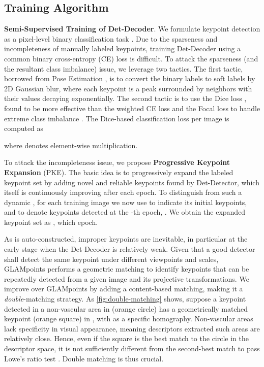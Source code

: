 \subsection{Training Algorithm}  \label{ssec:training}

\textbf{Semi-Supervised Training of Det-Decoder}.
We formulate keypoint detection as a pixel-level binary classification task \cite{detone2018superpoint, truong2019glampoints}. Due to the sparseness and incompleteness of manually labeled keypoints,  training Det-Decoder using a common binary cross-entropy (CE) loss is difficult. To attack the sparseness (and the resultant class imbalance) issue, we leverage two tactics. The first tactic, borrowed from Pose Estimation \cite{wei2016convolutional}, is to convert the binary labels  to soft labels  by 2D Gaussian blur, where each keypoint is a peak surrounded by neighbors with their values decaying exponentially. The second tactic is to use the Dice loss \cite{milletari2016v}, found to be  more effective than the weighted CE loss and the Focal loss to handle extreme class imbalance \cite{icpr20-lesion-net}. The Dice-based classification loss  per image is computed as 

where  denotes element-wise multiplication.

To attack the incompleteness issue, we propose \textbf{Progressive Keypoint Expansion} (PKE). The basic idea is to progressively expand the labeled keypoint set  by adding novel and reliable keypoints found by  Det-Detector, which itself is continuously improving after each epoch. To distinguish from such a dynamic , for each training image we now use  to indicate its initial keypoints, and  to denote keypoints detected at the -th epoch, . We obtain the expanded keypoint set  as , which  epoch. 

As  is auto-constructed, improper keypoints are inevitable, in particular at the early stage when the Det-Decoder is relatively weak. Given that a good detector shall detect the same keypoint under different viewpoints and scales, GLAMpoints performs a geometric matching to identify keypoints that can be repeatedly detected from a given image and its projective transformations. We improve over GLAMpoints by adding a content-based matching, making it a \emph{double}-matching strategy. As \cref{fig:double-matching} shows, suppose a keypoint detected in a non-vascular area in  (orange circle) has a geometrically matched keypoint (orange square) in , with  as a specific homography. Non-vascular areas lack specificity in visual appearance, meaning descriptors extracted such areas are relatively close. Hence, even if the square is the best match to the circle in the descriptor space, it is not sufficiently different from the second-best match to pass Lowe's ratio test \cite{lowe2004distinctive}. Double matching is thus crucial. 


